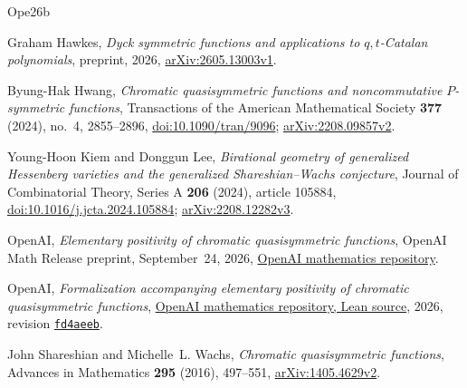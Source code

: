 \documentclass[11pt,reqno]{amsart}
\theoremstyle{definition}
\theoremstyle{remark}
\numberwithin{equation}{section}
\begin{document}
\begin{thebibliography}{Ope26b}

Graham Hawkes, \emph{Dyck symmetric functions and applications to
$q,t$-Catalan polynomials}, preprint, 2026,
\href{https://arxiv.org/abs/2605.13003v1}{arXiv:2605.13003v1}.

Byung-Hak Hwang, \emph{Chromatic quasisymmetric functions and
noncommutative $P$-symmetric functions},
Transactions of the American Mathematical Society
\textbf{377} (2024), no.~4, 2855--2896,
\href{https://doi.org/10.1090/tran/9096}{doi:10.1090/tran/9096};
\href{https://arxiv.org/abs/2208.09857v2}{arXiv:2208.09857v2}.

Young-Hoon Kiem and Donggun Lee, \emph{Birational geometry of generalized
Hessenberg varieties and the generalized Shareshian--Wachs conjecture},
Journal of Combinatorial Theory, Series A \textbf{206} (2024),
article 105884,
\href{https://doi.org/10.1016/j.jcta.2024.105884}{doi:10.1016/j.jcta.2024.105884};
\href{https://arxiv.org/abs/2208.12282v3}{arXiv:2208.12282v3}.

OpenAI, \emph{Elementary positivity of chromatic quasisymmetric
functions}, OpenAI Math Release preprint, September~24, 2026,
\href{https://github.com/openai/math/blob/fd4aeeb/preprints/Elementary-Positivity-of-Chromatic-Quasisymmetric-Functions-September-24-2026/paper.pdf}{OpenAI mathematics repository}.

OpenAI, \emph{Formalization accompanying elementary positivity of
chromatic quasisymmetric functions},
\href{https://github.com/openai/math/tree/fd4aeeb/lean/OAI/Combinatorics/Chromatic}{OpenAI mathematics repository, Lean source},
2026, revision
\href{https://github.com/openai/math/commit/fd4aeeb}{\texttt{fd4aeeb}}.

John Shareshian and Michelle~L. Wachs, \emph{Chromatic quasisymmetric
functions}, Advances in Mathematics \textbf{295} (2016), 497--551,
\href{https://arxiv.org/abs/1405.4629v2}{arXiv:1405.4629v2}.

\end{thebibliography}
\end{document}
